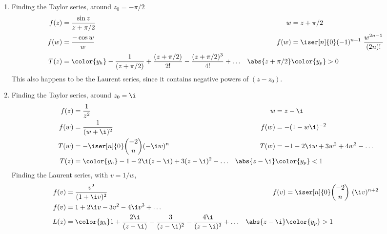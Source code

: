 \begin{enumerate}
    \item Finding the Taylor series, around $ z_0 = -\pi/2 $
          \begin{align}
              f(z)            & = \frac{\sin z}{z + \pi/2}                       &
              w               & = z + \pi/2                                        \\
              f(w)            & = \frac{-\cos w}{w}                              &
              f(w)            & = \iser[n]{0} (-1)^{n+1}\ \frac{w^{2n-1}}{(2n)!}   \\
              T(z)            & = \color{y_h} -\frac{1}{(z + \pi/2)}
              + \frac{(z + \pi/2)}{2!} - \frac{(z + \pi/2)^3}{4!}
              + \dots         &
              \abs{z + \pi/2} & \color{y_p} > 0
          \end{align}
          This also happens to be the Laurent series, since it contains negative
          powers of $ (z - z_0) $.

    \item Finding the Taylor series, around $ z_0 = \i $
          \begin{align}
              f(z)         & = \frac{1}{z^2}                                     &
              w            & = z - \i                                              \\
              f(w)         & = \frac{1}{(w + \i)^2}                              &
              f(w)         & = - (1 - w\i)^{-2}                                    \\
              T(w)         & = -\iser[n]{0} \binom{-2}{n} (-\i w)^n              &
              T(w)         & = -1 - 2\i w + 3w^2 + 4w^3 - \dots                    \\
              T(z)         & = \color{y_h} -1 - 2\i (z - \i) + 3(z-\i)^2 - \dots &
              \abs{z - \i} & \color{y_p} < 1
          \end{align}
          Finding the Laurent series, with $ v = 1/w $,
          \begin{align}
              f(v)         & = \frac{v^2}{(1 + \i v)^2}                &
              f(v)         & = \iser[n]{0} \binom{-2}{n}\ (\i v)^{n+2}   \\
              f(v)         & = 1 + 2\i v - 3 v^2 - 4\i v^3 + \dots       \\
              L(z)         & = \color{y_h} 1 + \frac{2\i}{(z - \i)}
              - \frac{3}{(z-\i)^2} - \frac{4\i}{(z-\i)^3}
              + \dots      &
              \abs{z - \i} & \color{y_p} > 1
          \end{align}


\end{enumerate}
